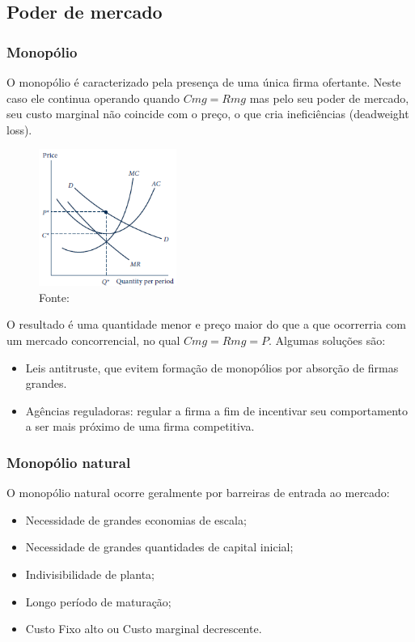 \documentclass[12pt,a4paper,oneside,brazil]{abntex2}
\begin{document}
\subsection{Poder de mercado}
\subsubsection{Monopólio}
O monopólio é caracterizado pela presença de uma única firma ofertante. Neste caso ele continua operando quando $Cmg = Rmg$ mas pelo seu poder de mercado, seu custo marginal não coincide com o preço, o que cria ineficiências (deadweight loss).
\clearpage
\begin{figure}
	\includegraphics[width=0.4\textwidth]{Monopoly.png}
	\centering
	\caption{Fonte: \cite{nicholson}}
\end{figure}
O resultado é uma quantidade menor e preço maior do que a que ocorrerria com um mercado concorrencial, no qual $Cmg = Rmg = P$. Algumas soluções são:
\begin{itemize}
\item Leis antitruste, que evitem formação de monopólios por absorção de firmas grandes.
\item Agências reguladoras: regular a firma a fim de incentivar seu comportamento a ser mais próximo de uma firma competitiva.
\end{itemize}
\clearpage
\subsubsection{Monopólio natural}
O monopólio natural ocorre geralmente por barreiras de entrada ao mercado:
\begin{itemize}
\item Necessidade de grandes economias de escala;
\item Necessidade de grandes quantidades de capital inicial;
\item Indivisibilidade de planta;
\item Longo período de maturação;
\item Custo Fixo alto ou Custo marginal decrescente.
\end{itemize}
\end{document}
